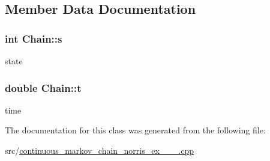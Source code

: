 \subsection{Member Data Documentation}
\subsubsection[{\texorpdfstring{s}{s}}]{\setlength{\rightskip}{0pt plus 5cm}int Chain\+::s}\hypertarget{classChain_a0edd1309c40f9d7d51d4b0ae5c831bb9}{}\label{classChain_a0edd1309c40f9d7d51d4b0ae5c831bb9}
state 
\subsubsection[{\texorpdfstring{t}{t}}]{\setlength{\rightskip}{0pt plus 5cm}double Chain\+::t}\hypertarget{classChain_a07bbad56f1ed3da3594326d8b14d1906}{}\label{classChain_a07bbad56f1ed3da3594326d8b14d1906}
time 

The documentation for this class was generated from the following file\+:\begin{DoxyCompactItemize}
\item 
src/\hyperlink{continuous__markov__chain__norris__ex__2__3__2_8cpp}{continuous\+\_\+markov\+\_\+chain\+\_\+norris\+\_\+ex\+\_\+\_\+\_.\+cpp}\end{DoxyCompactItemize}
